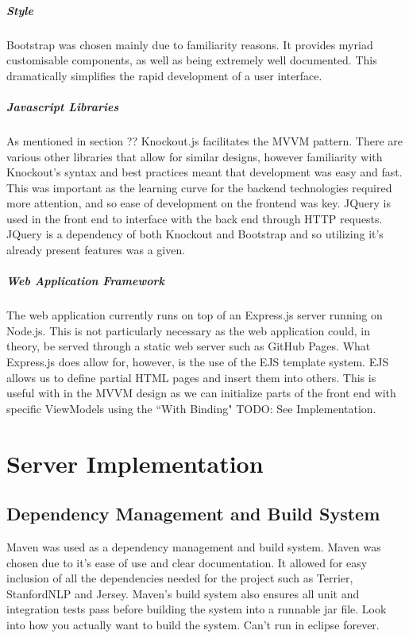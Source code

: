 \documentclass{l4proj}
\begin{document}
\paragraph{Style}
Bootstrap was chosen mainly due to familiarity reasons. It provides myriad customisable components, as well as being extremely well documented. This dramatically simplifies the rapid development of a user interface.

\paragraph{Javascript Libraries}
As mentioned in section ?? Knockout.js facilitates the MVVM pattern. There are various other libraries that allow for similar designs, however familiarity with Knockout's syntax and best practices meant that development was easy and fast.
This was important as the learning curve for the backend technologies required more attention, and so ease of development on the frontend was key.
JQuery is used in the front end to interface with the back end through HTTP requests. JQuery is a dependency of both Knockout and Bootstrap and so utilizing it's already present features was a given.

\paragraph{Web Application Framework}
The web application currently runs on top of an Express.js server running on Node.js. This is not particularly necessary as the web application could, in theory, be served through a static web server such as GitHub Pages. What Express.js does allow for, however, is the use of the EJS template system. EJS allows us to define partial HTML pages and insert them into others. This is useful with in the MVVM design as we can initialize parts of the front end with specific ViewModels using the ``With Binding" TODO: See Implementation.

\chapter{Server Implementation}
\section{Dependency Management and Build System}
Maven was used as a dependency management and build system. Maven was chosen due to it's ease of use and clear documentation. It allowed for easy inclusion of all the dependencies needed for the project such as Terrier, StanfordNLP and Jersey. Maven's build system also ensures all unit and integration tests pass before building the system into a runnable jar file. Look into how you actually want to build the system. Can't run in eclipse forever.
\end{document}
